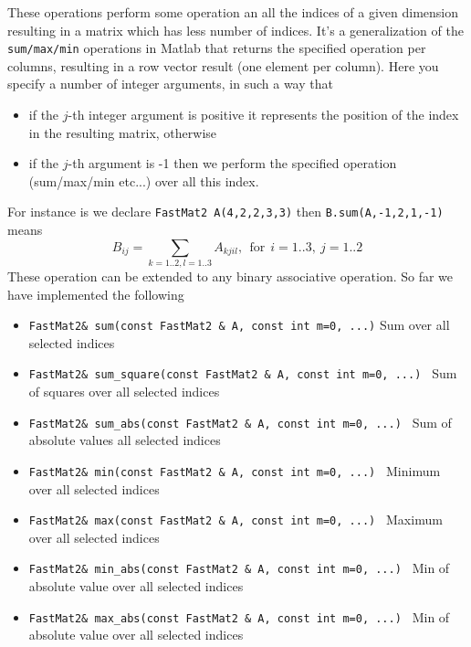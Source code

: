 {

These operations perform some operation an all the indices of a given
dimension resulting in a matrix which has less number of indices. It's
a generalization of the \verb+sum/max/min+ operations in Matlab that
returns the specified operation per columns, resulting in a row vector
result (one element per column). Here you specify a number of integer
arguments, in such a way that 
%
\begin{itemize}
\item if the $j$-th integer argument is
positive it represents the position of the index in the resulting
matrix, otherwise 
\item if the $j$-th argument is -1 then we perform the specified
operation (sum/max/min etc...) over all this index.
\end{itemize}
%
For instance is we declare \verb+FastMat2 A(4,2,2,3,3)+ then
\verb+B.sum(A,-1,2,1,-1)+ means
%
\begin{equation} 
   B_{ij} = \sum_{k=1..2,l=1..3} A_{kjil},\ \ \text{for}\ \
   i=1..3,\ j=1..2
\end{equation}
%
These operation can be extended to any binary associative
operation. So far we have implemented the following
%
\begin{itemize}
\item \verb+FastMat2& sum(const FastMat2 & A, const int m=0, ...)+
              Sum over all selected indices 
\item \verb+FastMat2& sum_square(const FastMat2 & A, const int m=0, ...) +
              Sum of squares over all selected indices 
\item \verb+FastMat2& sum_abs(const FastMat2 & A, const int m=0, ...) +
              Sum of absolute values all selected indices 
\item \verb+FastMat2& min(const FastMat2 & A, const int m=0, ...) +
              Minimum over all selected indices 
\item \verb+FastMat2& max(const FastMat2 & A, const int m=0, ...) +
              Maximum over all selected indices 
\item \verb+FastMat2& min_abs(const FastMat2 & A, const int m=0, ...) +
              Min of absolute value over all selected indices 
\item \verb+FastMat2& max_abs(const FastMat2 & A, const int m=0, ...) +
              Min of absolute value over all selected indices 
\end{itemize}

}
